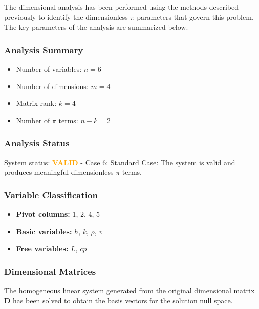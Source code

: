The dimensional analysis has been performed using the methods described previously to identify the dimensionless $\pi$ parameters that govern this problem. The key parameters of the analysis are summarized below.

\subsubsection*{Analysis Summary}
\begin{itemize}
\item Number of variables: $n = 6$
\item Number of dimensions: $m = 4$
\item Matrix rank: $k = 4$
\item Number of $\pi$ terms: $n - k = 2$
\end{itemize}

\subsubsection*{Analysis Status}
System status: \textcolor{orange}{\textbf{VALID}} - Case 6: Standard Case: The system is valid and produces meaningful dimensionless $\pi$ terms.

\subsubsection*{Variable Classification}
\begin{itemize}
\item \textbf{Pivot columns:} 1, 2, 4, 5
\item \textbf{Basic variables:} $h$, $k$, $\rho$, $v$
\item \textbf{Free variables:} $L$, $cp$
\end{itemize}

\subsubsection*{Dimensional Matrices}
The homogeneous linear system generated from the original dimensional matrix $\mathbf{D}$ has been solved to obtain the basis vectors for the solution null space.


